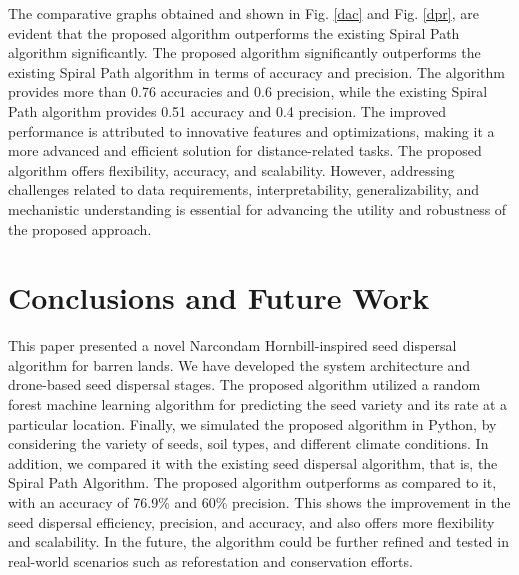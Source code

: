\documentclass[conference]{IEEEtran}
\begin{document}
 
The comparative graphs obtained and shown in Fig. \ref{dac} and Fig. \ref{dpr}, are evident that the proposed algorithm outperforms the existing Spiral Path algorithm \cite{9} significantly. The proposed algorithm significantly outperforms the existing Spiral Path algorithm in terms of accuracy and precision. The algorithm provides more than 0.76 accuracies and 0.6 precision, while the existing Spiral Path algorithm provides 0.51 accuracy and 0.4 precision. The improved performance is attributed to innovative features and optimizations, making it a more advanced and efficient solution for distance-related tasks. The proposed algorithm offers flexibility, accuracy, and scalability. However, addressing challenges related to data requirements, interpretability, generalizability, and mechanistic understanding is essential for advancing the utility and robustness of the proposed approach.

\section{Conclusions and Future Work}
This paper presented a novel Narcondam Hornbill-inspired seed dispersal algorithm for barren lands. We have developed the system architecture and drone-based seed dispersal stages. The proposed algorithm utilized a random forest machine learning algorithm for predicting the seed variety and its rate at a particular location. Finally, we simulated the proposed algorithm in Python, by considering the variety of seeds, soil types, and different climate conditions. In addition, we compared it with the existing seed dispersal algorithm, that is, the Spiral Path Algorithm. The proposed algorithm outperforms as compared to it, with an accuracy of 76.9\% and 60\% precision. This shows the improvement in the seed dispersal efficiency, precision, and accuracy, and also offers more flexibility and scalability. In the future, the algorithm could be further refined and tested in real-world scenarios such as reforestation and conservation efforts.
\end{document}
